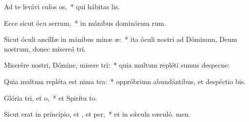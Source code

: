 \item Ad te levávi culos os,~* qui hábitas  lis.
\item Ecce sicut ócu serrum,~* in mánibus dominórum rum.
\item Sicut óculi ancíllæ in mánibus minæ æ:~* ita óculi nostri ad Dóminum, Deum nostrum, donec misereá tri.
\item Miserére nostri, Dómine, misere tri:~* quia multum repléti sumus despecne:
\item Quia multum repléta est nima tra:~* oppróbrium abundántibus, et despéctio bis.
\item Glória tri, et o,~* et Spirítu to.
\item Sicut erat in princípio, et , et per,~* et in sǽcula sæculó. men.

